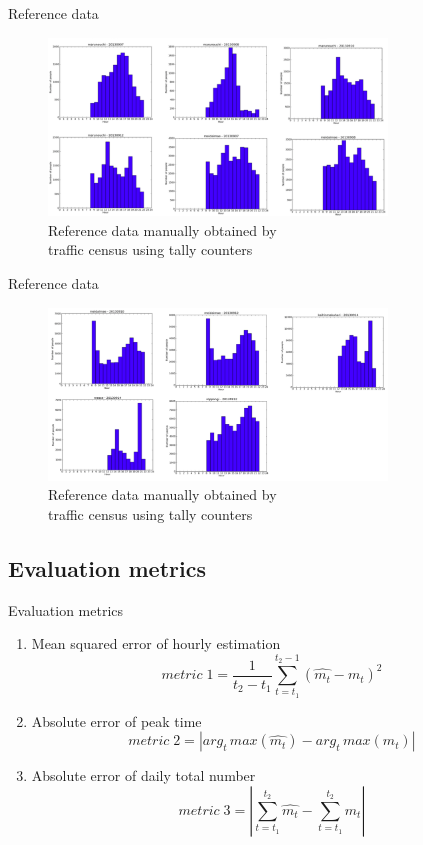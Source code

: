 \begin{frame}{Reference data}

\begin{figure}
\includegraphics[width = 9cm]{pic11.png}\\
Reference data manually obtained by \\
traffic census using tally counters
\end{figure}

\end{frame}

\begin{frame}{Reference data}

\begin{figure}
\includegraphics[width = 9cm]{pic12.png}\\
Reference data manually obtained by \\
traffic census using tally counters
\end{figure}

\end{frame}

\subsection{Evaluation metrics}\label{evaluation-metrics}

\begin{frame}{Evaluation metrics}

\begin{enumerate}
\def\labelenumi{\arabic{enumi}.}
\itemsep1pt\parskip0pt
\item
  Mean squared error of hourly estimation
  \[metric\; 1 = \frac{1}{t_2-t_1}\sum_{t=t_1}^{t_2-1}(\hat{m_t}-m_t)^2\]
\item
  Absolute error of peak time
  \[metric\; 2 = |arg_t\, max(\hat{m_t}) - arg_t\, max(m_t)|\]
\item
  Absolute error of daily total number
  \[metric\; 3 = |\sum_{t=t_1}^{t_2}\hat{m_t}-\sum_{t=t_1}^{t_2}m_t|\]
\end{enumerate}

\end{frame}

